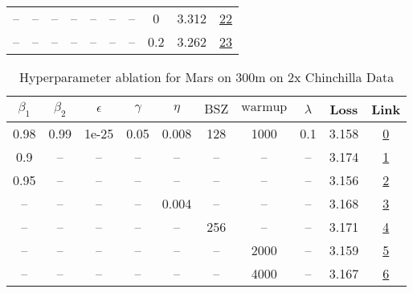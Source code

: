 \begin{table}[H]
\begin{tabular}{cccccccccc}
-- & -- & -- & -- & -- & -- & -- & 0 & 3.312 & \href{https://wandb.ai/stanford-mercury/optimizer-scaling/runs/sweep-300m-6B-mars17b945lr0.008-wd0-minlr0-warmup1000-b10.98-b20-409c3e}{22} \\
-- & -- & -- & -- & -- & -- & -- & 0.2 & 3.262 & \href{https://wandb.ai/stanford-mercury/optimizer-scaling/runs/sweep-300m-6B-mars399b10lr0.008-wd0.2-minlr0-warmup1000-b10.98-b-d46890}{23} \\
\bottomrule
\end{tabular}
\end{table}

\begin{table}[H]
\centering
\caption{Hyperparameter ablation for Mars on 300m on 2x Chinchilla Data}
\label{tab:ablation_mars_300m_2}
\begin{tabular}{cccccccccc}
\toprule
$\beta_1$ & $\beta_2$ & $\epsilon$ & $\gamma$ & $\eta$ & $\mathrm{BSZ}$ & $\mathrm{warmup}$ & $\lambda$ & Loss & Link \\
\midrule
0.98 & 0.99 & 1e-25 & 0.05 & 0.008 & 128 & 1000 & 0.1 & 3.158 & \href{https://wandb.ai/stanford-mercury/optimizer-scaling/runs/sweep-300m-12B-marskbb066blr0.008-wd0.1-minlr0-warmup1000-b10.98-f75ea4}{0} \\
\midrule
0.9 & -- & -- & -- & -- & -- & -- & -- & 3.174 & \href{https://wandb.ai/stanford-mercury/optimizer-scaling/runs/sweep-300m-12B-marsk83eefflr0.008-wd0.1-minlr0-warmup1000-b10.9--e2df5c}{1} \\
0.95 & -- & -- & -- & -- & -- & -- & -- & 3.156 & \href{https://wandb.ai/stanford-mercury/optimizer-scaling/runs/sweep-300m-12B-marskb945b4lr0.008-wd0.1-minlr0-warmup1000-b10.95-2538fa}{2} \\
-- & -- & -- & -- & 0.004 & -- & -- & -- & 3.168 & \href{https://wandb.ai/stanford-mercury/optimizer-scaling/runs/sweep-300m-12B-marsfd64d98lr0.004-wd0.1-minlr0-warmup1000-b10.98-e0cf98}{3} \\
-- & -- & -- & -- & -- & 256 & -- & -- & 3.171 & \href{https://wandb.ai/stanford-mercury/optimizer-scaling/runs/sweep-300m-12B-marsk65640blr0.008-wd0.1-minlr0-warmup1000-b10.98-745d48}{4} \\
-- & -- & -- & -- & -- & -- & 2000 & -- & 3.159 & \href{https://wandb.ai/stanford-mercury/optimizer-scaling/runs/sweep-300m-12B-marskf7adbelr0.008-wd0.1-minlr0-warmup2000-b10.98-b861e3}{5} \\
-- & -- & -- & -- & -- & -- & 4000 & -- & 3.167 & \href{https://wandb.ai/stanford-mercury/optimizer-scaling/runs/sweep-300m-12B-marskcd8133lr0.008-wd0.1-minlr0-warmup4000-b10.98-8a3bc4}{6} \\
\bottomrule
\end{tabular}
\end{table}

